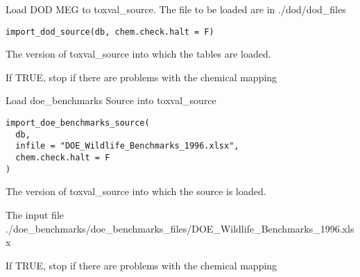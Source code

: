\documentclass[letterpaper]{book}
\begin{document}
%
\begin{Description}\relax
Load DOD MEG to toxval\_source. The file to be loaded are in ./dod/dod\_files
\end{Description}
%
\begin{Usage}
\begin{verbatim}
import_dod_source(db, chem.check.halt = F)
\end{verbatim}
\end{Usage}
%
\begin{Arguments}
\begin{ldescription}
\item[\code{db}] The version of toxval\_source into which the tables are loaded.

\item[\code{chem.check.halt}] If TRUE, stop if there are problems with the chemical mapping
\end{ldescription}
\end{Arguments}
%
\begin{Description}\relax
Load doe\_benchmarks Source into toxval\_source
\end{Description}
%
\begin{Usage}
\begin{verbatim}
import_doe_benchmarks_source(
  db,
  infile = "DOE_Wildlife_Benchmarks_1996.xlsx",
  chem.check.halt = F
)
\end{verbatim}
\end{Usage}
%
\begin{Arguments}
\begin{ldescription}
\item[\code{db}] The version of toxval\_source into which the source is loaded.

\item[\code{infile}] The input file ./doe\_benchmarks/doe\_benchmarks\_files/DOE\_Wildlife\_Benchmarks\_1996.xlsx

\item[\code{chem.check.halt}] If TRUE, stop if there are problems with the chemical mapping
\end{ldescription}
\end{Arguments}
\end{document}
